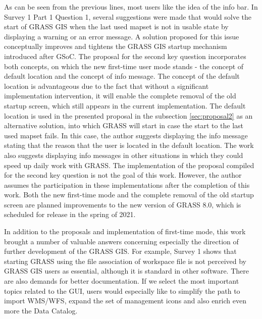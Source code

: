 \documentclass[a4paper,10pt,twoside]{article}
\begin{document}
As can be seen from the previous lines, most users like the idea of the info bar. In Survey 1 Part 1 Question 1, several suggestions were made that would solve the start of GRASS GIS when the last used mapset is not in usable state by displaying a warning or an error message. A solution proposed for this issue conceptually improves and tightens the GRASS GIS startup mechanism introduced after GSoC. The proposal for the second key question incorporates both concepts, on which the new first-time user mode stands - the concept of default location and the concept of info message. The concept of the default location is advantageous due to the fact that without a significant implementation intervention, it will enable the complete removal of the old startup screen, which still appears in the current implementation. The default location is used in the presented proposal in the subsection \ref{sec:proposal2} as an alternative solution, into which GRASS will start in case the start to the last used mapset fails. In this case, the author suggests displaying the info message stating that the reason that the user is located in the default location. The work also suggests displaying info messages in other situations in which they could speed up daily work with GRASS. The implementation of the proposal compiled for the second key question is not the goal of this work. However, the author assumes the participation in these implementations after the completion of this work. Both the new first-time mode and the complete removal of the old startup screen are planned improvements to the new version of GRASS 8.0, which is scheduled for release in the spring of 2021.

In addition to the proposals and implementation of first-time mode, this work brought a number of valuable answers concerning especially the direction of further development of the GRASS GIS. For example, Survey 1 shows that starting GRASS using the file association of workspace file is not perceived by GRASS GIS users as essential, although it is standard in other software. There are also demands for better documentation. If we select the most important topics related to the GUI, users would especially like to simplify the path to import WMS/WFS, expand the set of management icons and also enrich even more the Data Catalog.


\newpage
\vspace*{-6ex}
\renewcommand{\refname}{References} 
	
	
\end{document}
